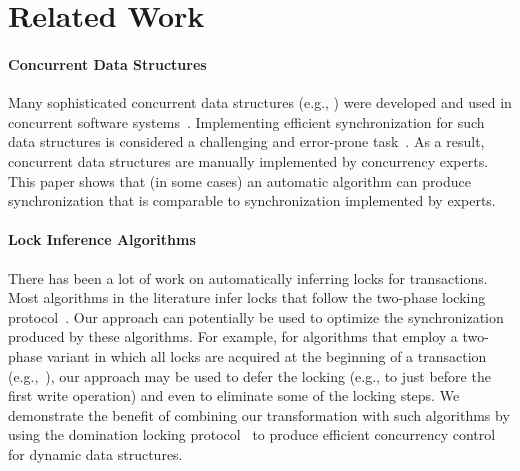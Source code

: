 \section{Related Work}\label{sec:related}
\paragraph{Concurrent Data Structures}
Many sophisticated concurrent data structures (e.g., \cite{ArbelA2014,DrachslerVY2014,NatarajanM2014,BrownER2014,CrainGR2013,BraginskyP2012,
AfekKKMT2012,EllenFRB2010,BronsonCCO2010,HerlihyLLS2007,fraser2004practical,Michael:1996})
were developed and used in concurrent software systems~\cite{Ohad:OOPSLA11}.
Implementing efficient synchronization for such data structures is considered a challenging and error-prone task~\cite{Ohad:OOPSLA11,Doh:SPAA04,Jin:2012}.
As a result, concurrent data structures are manually implemented by concurrency experts.
This paper shows that (in some cases) an automatic algorithm can produce synchronization that is comparable to synchronization implemented by experts.


\paragraph{Lock Inference Algorithms}
There has been a lot of work on automatically inferring locks for transactions.
Most   algorithms in the literature infer locks that follow the two-phase
locking protocol~\cite{MZGB:POPL06,Emmi06POPL,gudka2012lock,CCG:PLDI08,HFP:TRANSACT06,CGE:CC08}.
Our approach can potentially be used to optimize the synchronization produced by these algorithms.
For example, for  algorithms that employ a two-phase variant in which all locks are acquired at the beginning of a transaction (e.g.,~\cite{gudka2012lock,CCG:PLDI08}),
our approach may be used to defer the locking (e.g., to just before the first write operation) and even to eliminate some of the locking steps.
We demonstrate the benefit of combining our transformation with such algorithms
 by using the  domination locking protocol~\cite{Gueta2011} to produce efficient concurrency control for
dynamic data structures.

